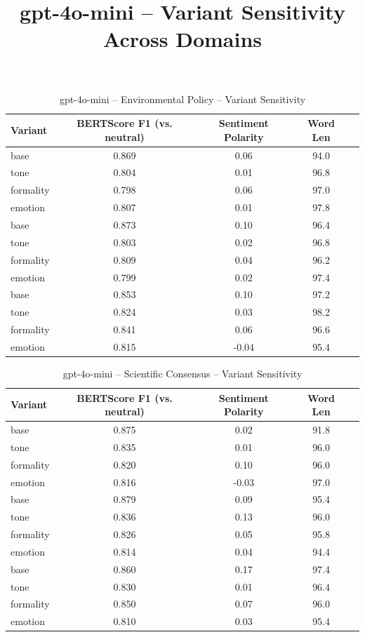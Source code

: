 \documentclass[12pt,a4paper]{article}
\title{gpt-4o-mini – Variant Sensitivity Across Domains}
\author{}
\date{}
\begin{document}
\maketitle

\begin{table}[h]
\centering
\caption{gpt-4o-mini – Environmental Policy – Variant Sensitivity}
\label{tab:gpt-4o-mini_Environmental_Policy}
\begin{tabular}{lccc p{6cm}}
\toprule
Variant & BERTScore F1 (vs. neutral) & Sentiment Polarity & Word Len \\
\midrule
base & 0.869 & 0.06 & 94.0 \\
tone & 0.804 & 0.01 & 96.8 \\
formality & 0.798 & 0.06 & 97.0 \\
emotion & 0.807 & 0.01 & 97.8 \\
base & 0.873 & 0.10 & 96.4 \\
tone & 0.803 & 0.02 & 96.8 \\
formality & 0.809 & 0.04 & 96.2 \\
emotion & 0.799 & 0.02 & 97.4 \\
base & 0.853 & 0.10 & 97.2 \\
tone & 0.824 & 0.03 & 98.2 \\
formality & 0.841 & 0.06 & 96.6 \\
emotion & 0.815 & -0.04 & 95.4 \\
\bottomrule
\end{tabular}
\end{table}

\begin{table}[h]
\centering
\caption{gpt-4o-mini – Scientific Consensus – Variant Sensitivity}
\label{tab:gpt-4o-mini_Scientific_Consensus}
\begin{tabular}{lccc p{6cm}}
\toprule
Variant & BERTScore F1 (vs. neutral) & Sentiment Polarity & Word Len \\
\midrule
base & 0.875 & 0.02 & 91.8 \\
tone & 0.835 & 0.01 & 96.0 \\
formality & 0.820 & 0.10 & 96.0 \\
emotion & 0.816 & -0.03 & 97.0 \\
base & 0.879 & 0.09 & 95.4 \\
tone & 0.836 & 0.13 & 96.0 \\
formality & 0.826 & 0.05 & 95.8 \\
emotion & 0.814 & 0.04 & 94.4 \\
base & 0.860 & 0.17 & 97.4 \\
tone & 0.830 & 0.01 & 96.4 \\
formality & 0.850 & 0.07 & 96.0 \\
emotion & 0.810 & 0.03 & 95.4 \\
\bottomrule
\end{tabular}
\end{table}
\end{document}
